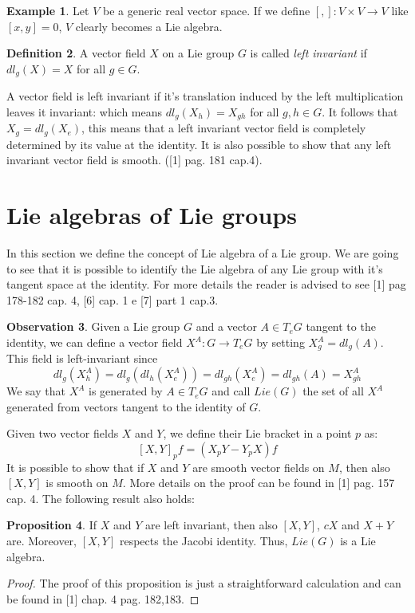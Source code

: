 \documentclass[12pt,a4paper]{report}
\theoremstyle{definition}
\newtheorem{Def}{Definition}[chapter]
\theoremstyle{Theorem}
\newtheorem{Prop}[Def]{Proposition}
\theoremstyle{definition}
\newtheorem{Ex}[Def]{Example}
\theoremstyle{definition}
\newtheorem{Obs}[Def]{Observation}
\begin{document}
	\begin{Ex}
		Let $V$ be a generic real vector space. If we define $[,]:V\times V\rightarrow V$ like $[x,y]=0$, $V$ clearly becomes a Lie algebra.
	\end{Ex}
	\begin{Def}
		A vector field $X$ on a Lie group $G$ is called \textit{left invariant} if $dl_g(X)=X$ for all $g\in G$.
	\end{Def}
	A vector field is left invariant if it's translation induced by the left multiplication leaves it invariant: which means $dl_g(X_h)=X_{gh}$ for all $g,h\in G$.
	It follows that $X_g=dl_g(X_e)$, this means that a left invariant vector field is completely determined by its value at the identity. It is also possible to show that any left invariant vector field is smooth. ([1] pag. 181 cap.4).
	\section{Lie algebras of Lie groups}
	In this section we define the concept of Lie algebra of a Lie group. We are going to see that it is possible to identify the Lie algebra of any Lie group with it's tangent space at the identity. For more details the reader is advised to see [1] pag 178-182 cap. 4, [6] cap. 1 e [7] part 1 cap.3.
	\begin{Obs} \label{Obs: 2.2}
		Given a Lie group $G$ and a vector $A\in T_eG$ tangent to the identity, we can define a vector field $X^A:G\rightarrow T_eG$ by setting $X^A_g=dl_g(A)$. This field is left-invariant since $$dl_g(X^A_h)=dl_g(dl_h(X^A_e))=dl_{gh}(X^A_e)=dl_{gh}(A)=X^A_{gh}$$
		We say that $X^A$ is generated by $A\in T_eG$ and call $Lie(G)$ the set of all $X^A$ generated from vectors tangent to the identity of $G$.	
	\end{Obs}
	Given two vector fields $X$ and $Y$, we define their Lie bracket in a point $p$ as:
	$$[X,Y]_pf=(X_pY-Y_pX)f$$
	It is possible to show that if $X$ and $Y$ are smooth vector fields on $M$, then also $[X,Y]$ is smooth on $M$. More details on the proof can be found in [1] pag. 157 cap. 4. The following result also holds:
	\begin{Prop}
		If $X$ and $Y$ are left invariant, then also $[X,Y]$, $cX$ and $X+Y$ are. Moreover, $[X,Y]$ respects the Jacobi identity. Thus, $Lie(G)$ is a Lie algebra.
	\end{Prop}
	\begin{proof}
		The proof of this proposition is just a straightforward calculation and can be found in [1] chap. 4 pag. 182,183.
	\end{proof}
\end{document}
